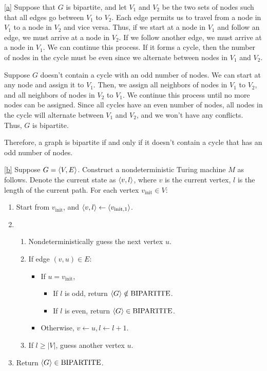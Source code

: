 \documentclass{homework}
\begin{document}
\begin{solution}

  \ref{a}
  Suppose that $G$ is bipartite, and let $V_1$ and $V_2$ be the two sets of
  nodes such that all edges go between $V_1$ to $V_2$. Each edge permits us
  to travel from a node in $V_1$ to a node in $V_2$ and vice versa. Thus, if
  we start at a node in $V_1$ and follow an edge, we must arrive at a node in
  $V_2$. If we follow another edge, we must arrive at a node in $V_1$. We can
  continue this process. If it forms a cycle, then the number of nodes in the
  cycle must be even since we alternate between nodes in $V_1$ and $V_2$.

  Suppose $G$ doesn't contain a cycle with an odd number of nodes. We can
  start at any node and assign it to $V_1$. Then, we assign all neighbors of
  nodes in $V_1$ to $V_2$, and all neighbors of nodes in $V_2$ to $V_1$. We
  continue this process until no more nodes can be assigned. Since all cycles
  have an even number of nodes, all nodes in the cycle will alternate
  between $V_1$ and $V_2$, and we won't have any conflicts. Thus, $G$ is
  bipartite.

  Therefore, a graph is bipartite if and only if it doesn't contain a cycle
  that has an odd number of nodes.

  \ref{b}
  Suppose $G = \langle V, E\rangle$.
  Construct a nondeterministic Turing machine $M$ as follows.
  Denote the current state as $\langle v, l\rangle$,
  where $v$ is the current vertex, $l$ is the length of the current path.
  For each vertex $v_{\text{init}} \in V$:
  \begin{enumerate}
    \item Start from $v_{\text{init}}$, and
    $\langle v, l\rangle \gets \langle v_{\text{init}, 1}\rangle$.
    \item 
      \begin{enumerate}
        \item Nondeterministically guess the next vertex $u$.
        \item If edge $(v, u) \in E$:
          \begin{itemize}
            \item If $u = v_{\text{init}}$,
            \begin{itemize}
              \item If $l$ is odd, return $\langle G\rangle \notin \mathrm{BIPARTITE}$.
              \item If $l$ is even, return $\langle G\rangle \in \mathrm{BIPARTITE}$.
            \end{itemize}
            \item Otherwise, $v \gets u, l \gets l + 1$.
          \end{itemize}
        \item If $l \ge |V|$, guess another vertex $u$.
      \end{enumerate}
    \item Return $\langle G\rangle \in \mathrm{BIPARTITE}$.
  \end{enumerate}


\end{solution}
\end{document}
